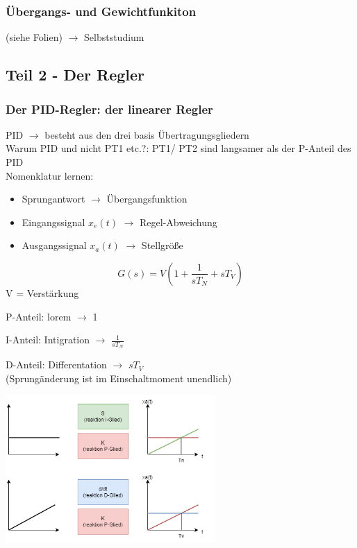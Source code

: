 \documentclass[a4paper, twoside, 11pt]{article}
\begin{document}
\subsubsection*{Übergangs- und Gewichtfunkiton}
(siehe Folien) $\rightarrow$ Selbststudium

\newpage
\subsection*{Teil 2 - Der Regler}
\subsubsection*{Der PID-Regler: der linearer Regler}
PID $\rightarrow$ besteht aus den drei basis Übertragungsgliedern \\
Warum PID und nicht PT1 etc.?: PT1/ PT2 sind langsamer als der P-Anteil des PID \\

Nomenklatur lernen: 
\begin{itemize}
	\item Sprungantwort $\rightarrow$ Übergangsfunktion
	\item Eingangssignal $x_e(t)$ $\rightarrow$ Regel-Abweichung
	\item Ausgangssignal $x_a(t)$ $\rightarrow$ Stellgröße
\end{itemize}

\[
G(s) = V(1+ \frac{1}{sT_N}+ sT_V)
\]
V = Verstärkung
\begin{multicols}{3}
	P-Anteil: lorem $\rightarrow$  1

	\columnbreak
	I-Anteil: Intigration $\rightarrow$ $\frac{1}{sT_N}$

	\columnbreak
	D-Anteil: Differentation $\rightarrow$ $sT_V$ \\
	(Sprungänderung ist im Einschaltmoment unendlich)
\end{multicols}
\begin{center}
	\includegraphics[width=0.6\textwidth]{19_11_2024_reglungstechnik.png}
\end{center}
\end{document}
